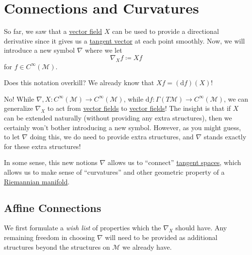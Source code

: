 \chapter{Connections and Curvatures}
So far, we saw that a \hyperref[def:vector-field]{vector field} \(X\) can be used to provide a directional derivative since it gives us a \hyperref[def:tangent-vector]{tangent vector} at each point smoothly. Now, we will introduce a new symbol \(\nabla \) where we let
\[
	\nabla _X f\coloneqq Xf
\]
for \(f\in C^{\infty} (\mathcal{M} )\).

\begin{problem*}
	Does this notation overkill? We already know that \(Xf = (\mathrm{d} f)(X)\)!
\end{problem*}
\begin{answer}
	No! While \(\nabla , X\colon C^{\infty} (\mathcal{M} ) \to C^{\infty} (\mathcal{M} )\), while \(\mathrm{d} f\colon \Gamma (T \mathcal{M} ) \to C^{\infty} (\mathcal{M} )\), we can generalize \(\nabla _X\) to act from \hyperref[def:vector-field]{vector fields} to \hyperref[def:vector-field]{vector fields}! The insight is that if \(X\) can be extended naturally (without providing any extra structures), then we certainly won't bother introducing a new symbol. However, as you might guess, to let \(\nabla \) doing this, we do need to provide extra structures, and \(\nabla \) stands exactly for these extra structures!
\end{answer}

In some sense, this new notions \(\nabla \) allows us to ``connect'' \hyperref[def:tangent-space]{tangent spaces}, which allows us to make sense of ``curvatures'' and other geometric property of a \hyperref[def:Riemannian-manifold]{Riemannian manifold}.

\section{Affine Connections}
We first formulate a \emph{wish list} of properties which the \(\nabla _X\) should have. Any remaining freedom in choosing \(\nabla \) will need to be provided as additional structures beyond the structures on \(\mathcal{M}\) we already have.

